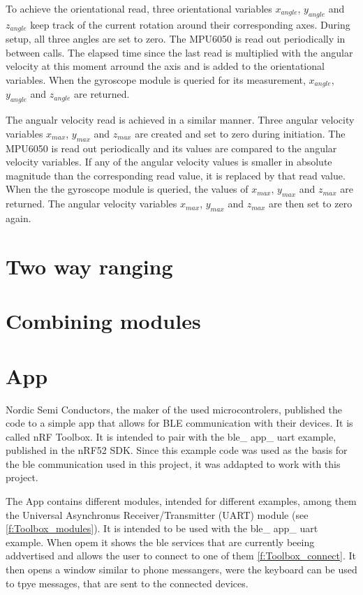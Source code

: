 To achieve the orientational read, three orientational variables $x_{angle}$, $y_{angle}$ and $z_{angle}$ keep track of the current rotation around their corresponding axes.
During setup, all three angles are set to zero.
The MPU6050 is read out periodically in between calls.
The elapsed time since the last read is multiplied with the angular velocity at this moment arround the axis and is added to the orientational variables.
When the gyroscope module is queried for its measurement, $x_{angle}$, $y_{angle}$ and $z_{angle}$ are returned.


The angualr velocity read is achieved in a similar manner.
Three angular velocity variables $x_{max}$, $y_{max}$ and $z_{max}$ are created and set to zero during initiation.
The MPU6050 is read out periodically and its values are compared to the angular velocity variables.
If any of the angular velocity values is smaller in absolute magnitude than the corresponding read value, it is replaced by that read value.
When the the gyroscope module is queried, the values of $x_{max}$, $y_{max}$ and $z_{max}$ are returned.
The angular velocity variables $x_{max}$, $y_{max}$ and $z_{max}$ are then set to zero again.


\section{Two way ranging}
\label{ss:two_way_ranging}



\section{Combining modules}
\label{ss:combination}


\section{App}
\label{s:app}
Nordic Semi Conductors, the maker of the used microcontrolers, published the code to a simple app that allows for BLE communication with their devices.
It is called nRF Toolbox.
It is intended to pair with the ble\_ app\_ uart example, published in the nRF52 SDK.
Since this example code was used as the basis for the ble communication used in this project, it was addapted to work with this project.


The App contains different modules, intended for different examples, among them the Universal Asynchronus Receiver/Transmitter (UART) module (see \ref{f:Toolbox_modules}).
It is intended to be used with the ble\_ app\_ uart example.
When opem it shows the ble services that are currently beeing addvertised and allows the user to connect to one of them \ref{f:Toolbox_connect}.
It then opens a window similar to phone messangers, were the keyboard can be used to tpye messages, that are sent to the connected devices.

